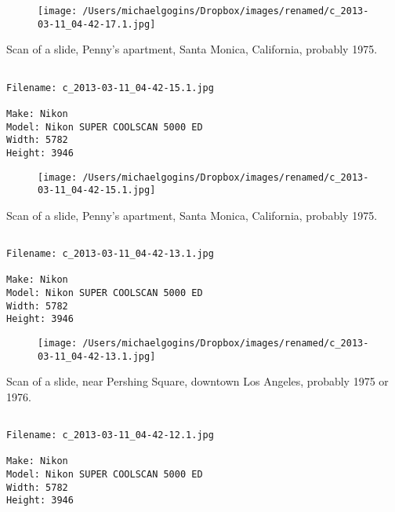 \begin{figure}
\texttt{[image: /Users/michaelgogins/Dropbox/images/renamed/c\_2013-03-11\_04-42-17.1.jpg]}
\end{figure}
    
\clearpage
\onecolumn
\noindent Scan of a slide, Penny's apartment, Santa Monica, California, probably 1975.
\noindent
\begin{lstlisting}

Filename: c_2013-03-11_04-42-15.1.jpg

Make: Nikon
Model: Nikon SUPER COOLSCAN 5000 ED
Width: 5782
Height: 3946
\end{lstlisting}
\clearpage

\begin{figure}
\texttt{[image: /Users/michaelgogins/Dropbox/images/renamed/c\_2013-03-11\_04-42-15.1.jpg]}
\end{figure}
    
\clearpage
\onecolumn
\noindent Scan of a slide, Penny's apartment, Santa Monica, California, probably 1975.
\noindent
\begin{lstlisting}

Filename: c_2013-03-11_04-42-13.1.jpg

Make: Nikon
Model: Nikon SUPER COOLSCAN 5000 ED
Width: 5782
Height: 3946
\end{lstlisting}
\clearpage

\begin{figure}
\texttt{[image: /Users/michaelgogins/Dropbox/images/renamed/c\_2013-03-11\_04-42-13.1.jpg]}
\end{figure}
    
\clearpage
\onecolumn
\noindent Scan of a slide, near Pershing Square, downtown Los Angeles, probably 1975 or 1976.
\noindent
\begin{lstlisting}

Filename: c_2013-03-11_04-42-12.1.jpg

Make: Nikon
Model: Nikon SUPER COOLSCAN 5000 ED
Width: 5782
Height: 3946
\end{lstlisting}
\clearpage

